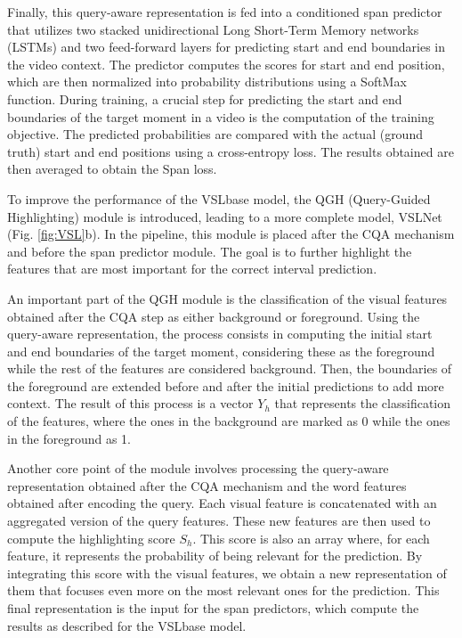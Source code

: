 \documentclass[10pt,twocolumn,letterpaper]{article}
\begin{document}
Finally, this query-aware representation is fed into a conditioned span predictor that utilizes two stacked unidirectional Long Short-Term Memory networks (LSTMs) and two feed-forward layers for predicting start and end boundaries in the video context. The predictor computes the scores for start and end position, which are then normalized into probability distributions using a SoftMax function. During training, a crucial step for predicting the start and end boundaries of the target moment in a video is the computation of the training objective. The predicted probabilities are compared with the actual (ground truth) start and end positions using a cross-entropy loss. The results obtained are then averaged to obtain the Span loss.

To improve the performance of the VSLbase model, the QGH (Query-Guided Highlighting) module is introduced, leading to a more complete model, VSLNet (Fig. \ref{fig:VSL}b). In the pipeline, this module is placed after the CQA mechanism and before the span predictor module. The goal is to further highlight the features that are most important for the correct interval prediction.

An important part of the QGH module is the classification of the visual features obtained after the CQA step as either background or foreground. Using the query-aware representation, the process consists in computing the initial start and end boundaries of the target moment, considering these as the foreground while the rest of the features are considered background. Then, the boundaries of the foreground are extended before and after the initial predictions to add more context. The result of this process is a vector $Y_{h}$ that represents the classification of the features, where the ones in the background are marked as 0 while the ones in the foreground as 1.

Another core point of the module involves processing the query-aware representation obtained after the CQA mechanism and the word features obtained after encoding the query. Each visual feature is concatenated with an aggregated version of the query features. These new features are then used to compute the highlighting score $S_{h}$. This score is also an array where, for each feature, it represents the probability of being relevant for the prediction. By integrating this score with the visual features, we obtain a new representation of them that focuses even more on the most relevant ones for the prediction. This final representation is the input for the span predictors, which compute the results as described for the VSLbase model.
\end{document}
